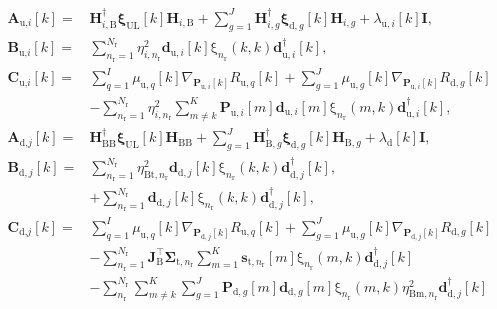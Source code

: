 \documentclass[9pt,journal]{IEEEtran}
\newcommand{\paren}[1]{\left({#1}\right)}
\newcommand{\bracket}[1]{{\left [{#1}\right ]}}
\newcommand{\rr}{_\mathrm{r}}
\newcommand{\B}{\textrm{B}}
\newcommand{\target}{\mathrm{t}}
\newcommand{\sigmanr}{\boldsymbol{\Sigma}_{\textrm{t},n\rr}}
\newcommand{\dBjone}{\mathbf{d}_{\textrm{d},j}\bracket{k}}
\newcommand{\dBjoneH}{\mathbf{d}^\dagger_{\textrm{d},j}\bracket{k}}
\newcommand{\dBjn}{\mathbf{d}_{\textrm{d},j}\bracket{k}}
\newcommand{\PiB}{\mathbf{P}_{\textrm{u},i}\bracket{k}}
\newcommand{\PBj}{\mathbf{P}_{\textrm{d},j}\bracket{k}}
\newcommand{\HBB}{\mathbf{H}_{\mathrm{BB}}}
\newcommand{\HBBH}{\mathbf{H}^\dagger_{\mathrm{BB}}}
\newcommand{\HiBH}{\mathbf{H}^\dagger_{i,\textrm{B}}}
\theoremstyle{definition}
\begin{document}
\begin{subequations}
\begin{align}
\mathbf{A}_{\textrm{u,}i}\bracket{k}=&\HiBH\boldsymbol{\xi}_{\textrm{UL}}\bracket{k}\mathbf{H}_{i,\B}+\sum_{g=1}^\mathit{J}\mathbf{H}^\dagger_{i,g}\boldsymbol{\xi}_{\textrm{d},g}\bracket{k}\mathbf{H}_{i,g}+\lambda_{\textrm{u},i}\bracket{k}\mathbf{I},\nonumber\\
\mathbf{B}_{\textrm{u,}i}\bracket{k} =& \sum_{n\rr=1}^{\mathit{N}\rr}\eta^2_{i,n\rr}\mathbf{d}_{\textrm{u},i}\bracket{k}\mathrm{\xi}_{n\rr}\paren{k,k}\mathbf{d}^\dagger_{\textrm{u},i}\bracket{k},\nonumber\\
\mathbf{C}_{\textrm{u,}i}\bracket{k}=& \sum_{q=1}^{\mathit{I}}\mu_{\textrm{u},q}\bracket{k}\nabla_{\PiB}\mathit{R}_{\textrm{u},q}\bracket{k}+\sum_{g=1}^{J}\mu_{\textrm{u},g}\bracket{k}\nabla_{\PiB}\mathit{R}_{\textrm{d},g}\bracket{k}\nonumber\\
&-\sum_{n\rr=1}^{\mathit{N}\rr}\eta^2_{i,n\rr}\sum_{m\neq k}^{\mathrm{\mathit{K}}}\mathbf{P}_{\textrm{u},i}\bracket{m}\mathbf{d}_{\textrm{u},i}\bracket{m}\mathrm{\xi}_{n\rr}\paren{m,k}\mathbf{d}^\dagger_{\textrm{u},i}\bracket{k},\nonumber\\
\mathbf{A}_{\textrm{d,}j}\bracket{k}=&\HBBH\boldsymbol{\xi}_{\textrm{UL}}\bracket{k}\HBB+\sum_{g=1}^{\mathit{J}}\mathbf{H}^\dagger_{\B,g}\boldsymbol{\xi}_{\textrm{d},g}\bracket{k}\mathbf{H}_{\B,g}+\lambda_\textrm{d}\bracket{k}\mathbf{I},\nonumber\\
\mathbf{B}_{\textrm{d},j}\bracket{k}=&\sum_{n\rr=1}^{\mathit{N}\rr}\eta^2_{\textrm{Bt},n\rr}\dBjone\mathrm{\xi}_{n\rr}\paren{k,k}\dBjoneH,\nonumber\\
&+\sum_{n\rr=1}^{\mathit{N}\rr}\dBjn\mathrm{\xi}_{n\rr}\paren{k,k}\mathbf{d}^\dagger_{\textrm{d},j}\bracket{k},\nonumber\\
\mathbf{C}_{\textrm{d,}j}\bracket{k}=& \sum_{q=1}^{\mathit{I}}\mu_{\textrm{u},q}\bracket{k}\nabla_{\PBj}\mathit{R}_{\textrm{u},q}\bracket{k}+\sum_{g=1}^{\mathit{J}}\mu_{\textrm{u},g}\bracket{k}\nabla_{\PBj}\mathit{R}_{\textrm{d},g}\bracket{k}\nonumber\\
&-\sum_{n\rr=1}^{\mathit{N}\rr}\mathbf{J}^\top_{\textrm{B}}\sigmanr\sum_{m=1}^{\mathrm{\mathit{K}}}\mathbf{s}_{\target,n\rr}\bracket{m}\mathrm{\xi}_{n\rr}\paren{m,k}\mathbf{d}^\dagger_{\textrm{d},j}\bracket{k}\nonumber\\
&-\sum_{n\rr}^{\mathit{N}\rr}\sum_{m\neq k}^{\mathrm{\mathit{K}}}\sum_{g=1}^{\mathit{J}}\mathbf{P}_{\textrm{d},g}\bracket{m}\mathbf{d}_{\textrm{d},g}\bracket{m}\mathrm{\xi}_{n\rr}\paren{m,k}\eta^2_{\textrm{Bm},n\rr}\mathbf{d}^\dagger_{\textrm{d},j}\bracket{k}\nonumber\\

\end{align}
\end{subequations}
\end{document}

